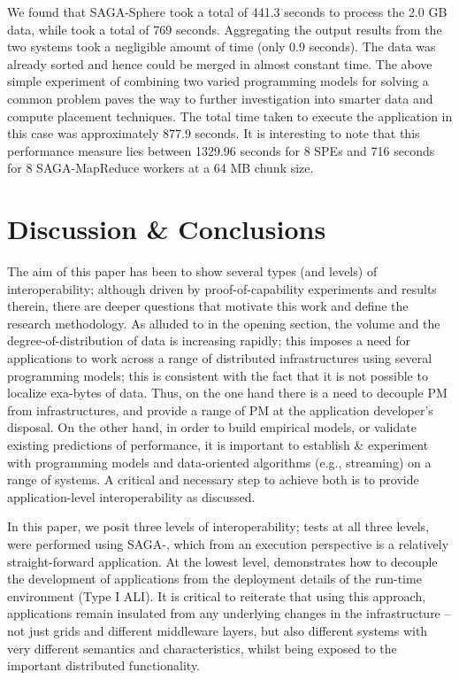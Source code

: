 \documentclass[3p,twocolumn]{elsarticle}
\begin{document}
We found that SAGA-Sphere took a total of 441.3 seconds to process the
2.0 GB data, while \sagamapreduce took a total of 769
seconds. Aggregating the output results from the two systems took a
negligible amount of time (only 0.9 seconds). The data was already
sorted and hence could be merged in almost constant
time. %
The above simple experiment of combining two varied programming models
for solving a common problem paves the way to further investigation
into smarter data and compute placement techniques.  The total time
taken to execute the \wc application in this case was approximately
877.9 seconds. It is interesting to note that this performance measure
lies between 1329.96 seconds for 8 SPEs and 716 seconds for 8
SAGA-MapReduce workers at a 64 MB chunk size.

\section{Discussion \& Conclusions}
\label{sec:discuss}

The aim of this paper has been to show several types (and levels) of
interoperability; although driven by proof-of-capability experiments
and results therein, there are deeper questions that motivate this
work and define the research methodology.  As alluded to in the
opening section, the volume and the degree-of-distribution of data is
increasing rapidly; this imposes a need for applications to work
across a range of distributed infrastructures using several
programming models; this is consistent with the fact that it is not
possible to localize exa-bytes of data.  Thus, on the one hand there
is a need to decouple PM from infrastructures, and provide a range of
PM at the application developer's disposal. On the other hand, in
order to build empirical models, or validate existing predictions of
performance, it is important to establish \& experiment with
programming models and data-oriented algorithms (e.g., streaming) on a
range of systems. %
A critical and necessary step to achieve both is to provide
application-level interoperability as discussed.

In this paper, we posit three levels of interoperability; tests at all
three levels, were performed using SAGA-\mr, which from an execution
perspective is a relatively straight-forward application.  At the
lowest level, \sagamapreduce demonstrates how to decouple the
development of applications from the deployment details of the
run-time environment (Type I ALI).  It is critical to reiterate that
using this approach, applications remain insulated from any underlying
changes in the infrastructure -- not just grids and different
middleware layers, but also different systems with very different
semantics and characteristics, whilst being exposed to the important
distributed functionality.
\end{document}

